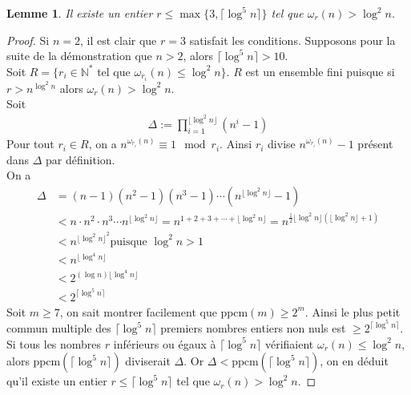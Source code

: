 \documentclass[11pt]{article}
\newtheorem{lemm}{Lemme}[subsection]
\newcommand{\ppcm}{\mathrm{ppcm}}
\begin{document}
\begin{lemm}
Il existe un entier $r \leqslant \max \lbrace 3, \lceil \log^5 n \rceil \rbrace$ tel que $\omega_r(n) > \log^2 n$.
\end{lemm}

\begin{small}
\begin{proof}
Si $n=2$, il est clair que $r=3$ satisfait les conditions. Supposons pour la suite de la démonstration que $n>2$, alors $\lceil \log^5 n \rceil > 10$.\\

\noindent
Soit $R=\lbrace r_i \in \mathbb{N}^\ast$ tel que $\omega_{r_i}(n) \leqslant \log^2 n \rbrace$. $R$ est un ensemble fini puisque si $r > n^{\log^2 n}$ alors $\omega_r(n) > \log^2 n$.\\

\noindent
Soit
\begin{align*}
\Delta := \prod_{i=1}^{\lfloor \log^2 n \rfloor} (n^i - 1)
\end{align*}
Pour tout $r_i \in R$, on a $n^{\omega_{r_i}(n)} \equiv 1 \mod r_i$. Ainsi $r_i$ divise $n^{\omega_{r_i}(n)} - 1$ présent dans $\Delta$ par définition.\\

\noindent
On a
\begin{align*}
\Delta &= (n-1)(n^2-1)(n^3-1) \cdots (n^{\lfloor \log^2 n \rfloor}-1)\\
&<n \cdot n^2 \cdot n^3 \cdots n^{\lfloor \log^2 n \rfloor} = n^{1+2+3+\cdots+\lfloor \log^2 n \rfloor}= n^{\frac{1}{2} \lfloor \log^2 n \rfloor (\lfloor \log^2 n \rfloor + 1)}\\
&< n^{{\lfloor \log^2 n \rfloor}^2} \text{puisque $\log^2 n > 1$}\\
&< n^{\lfloor \log^4 n \rfloor}\\
&< 2^{(\log n) \lfloor \log^4 n \rfloor}\\
&< 2^{\lceil \log^5 n \rceil}
\end{align*}
Soit $m \geqslant 7$, on sait montrer facilement que $\ppcm(m) \geqslant 2^{m}$. Ainsi le plus petit commun multiple des $\lceil \log^5 n \rceil$ premiers nombres entiers non nuls est $\geqslant 2^{\lceil \log^5 n \rceil}$. Si tous les nombres $r$ inférieurs ou égaux à $\lceil \log^5 n \rceil$ vérifiaient $\omega_r(n) \leqslant \log^2 n$, alors $\ppcm(\lceil \log^5 n \rceil)$ diviserait $\Delta$. Or $\Delta < \ppcm(\lceil \log^5 n \rceil)$, on en déduit qu'il existe un entier $r \leqslant \lceil \log^5 n \rceil$ tel que $\omega_r(n) > \log^2 n$.
\end{proof}
\end{small}
\end{document}
